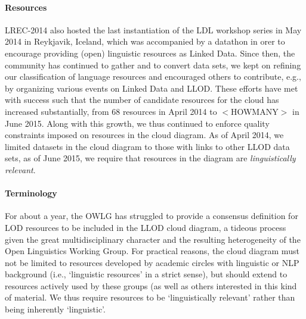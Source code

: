 \paragraph{Resources} 
LREC-2014 also hosted the last instantiation of the LDL workshop series in May 2014 in Reykjavik, Iceland, which was accompanied by a datathon in orer to encourage providing (open) linguistic resources as Linked Data. 
Since then, the community has continued to gather and to convert data sets, we kept on refining our classification of language resources and encouraged others to contribute, e.g., by organizing various events on Linked Data and LLOD.
These efforts have met with success such that the number of candidate resources for the cloud has increased substantially, from 68 resources in April 2014 to $<$HOWMANY$>$ in June 2015. Along with this growth, we thus continued to enforce quality constraints imposed on resources in the cloud diagram. As of April 2014, we limited datasets in the cloud diagram to those with links to other LLOD data sets, as of June 2015, we require that resources in the diagram are \emph{linguistically relevant}.

\paragraph{Terminology}
For about a year, the OWLG has struggled to provide a consensus definition for LOD resources to be included in the LLOD cloud diagram, a tideous process given the great multidisciplinary character and the resulting heterogeneity of the Open Linguistics Working Group. 
For practical reasons, the cloud diagram must not be limited to resources developed by academic circles with linguistic or NLP background (i.e., `linguistic resources' in a strict sense), but should extend to resources actively used by these groups (as well as others interested in this kind of material. We thus require resources to be `linguistically relevant' rather than being inherently `linguistic'.


